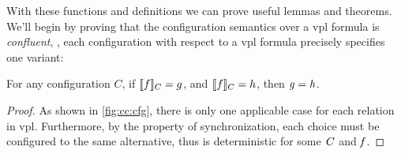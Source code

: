 With these functions and definitions we can prove useful lemmas and theorems.
%
We'll begin by proving that the configuration semantics over a \ac{vpl} formula
is \emph{confluent}, \ie{}, each configuration with respect to a \ac{vpl}
formula precisely specifies one variant:
%
\begin{lemma}
  \label{lemma:vpl:deterministic}
  For any configuration $C$, if \ensuremath{\semL f \semR_{C} = g}, and
  \ensuremath{\semL f \semR_{C} = h}, then $\mathit{g} = \mathit{h}$.
\end{lemma}
%
\begin{proof}
  As shown in \autoref{fig:cc:cfg}, there is only one applicable case for each
  relation in \ac{vpl}. Furthermore, by the property of synchronization, each
  choice must be configured to the same alternative, thus  is
  deterministic for some $\mathit{C}$ and $\mathit{f}$.
\end{proof}

